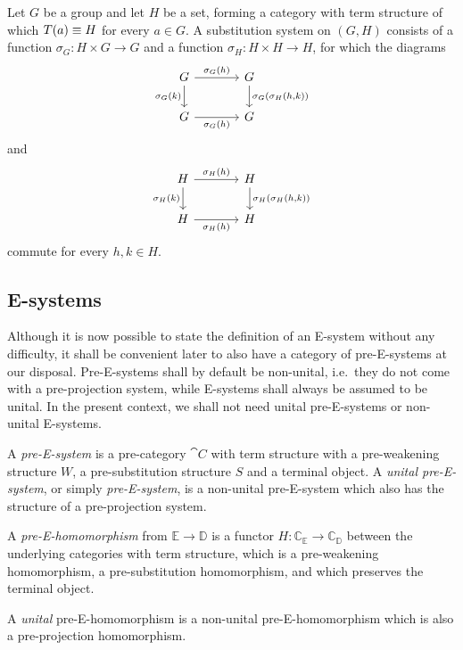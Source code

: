 \begin{eg}
Let $G$ be a group and let $H$ be a set, forming a category with term 
structure of which $T(a)\equiv H$ for every $a\in G$. A substitution
system on $(G,H)$ consists of a function $\sigma_G : H\times G\to G$ and
a function $\sigma_H:H\times H\to H$, for which the diagrams
\begin{equation*}
\begin{tikzcd}[column sep=large]
G \arrow[r,"\sigma_G(h)"]
  \arrow[d,swap,"\sigma_G(k)"]
  &
G \arrow[d,"{\sigma_G(\sigma_H(h,k))}"]
  \\
G \arrow[r,swap,"\sigma_G(h)"] 
& G
\end{tikzcd}
\end{equation*}
and
\begin{equation*}
\begin{tikzcd}[column sep=large]
H \arrow[r,"\sigma_H(h)"]
  \arrow[d,swap,"\sigma_H(k)"]
  &
H \arrow[d,"{\sigma_H(\sigma_H(h,k))}"]
  \\
H \arrow[r,swap,"\sigma_H(h)"]
  &
H
\end{tikzcd}
\end{equation*}
commute for every $h,k\in H$. 
\end{eg}

\subsection{E-systems}

Although it is now possible to state the definition of an E-system without
any difficulty, it shall be convenient later to also have a category of
pre-E-systems at our disposal. Pre-E-systems shall by default be non-unital,
i.e.~they do not come with a pre-projection system, while E-systems shall
always be assumed to be unital. In the present context, we shall not need
unital pre-E-systems or non-unital E-systems.

\begin{defn}
A \emph{pre-E-system} is a pre-category $\cat{C}$ with term structure
with a pre-weakening structure $W$, a pre-substitution structure $S$ and a terminal
object. A \emph{unital pre-E-system}, or simply \emph{pre-E-system}, is a non-unital pre-E-system
which also has the structure of a pre-projection system. 
\end{defn}

\begin{defn}
A \emph{pre-E-homomorphism} from $\mathbb{E}\to\mathbb{D}$ is a functor
$H:\mathbb{C}_\mathbb{E}\to\mathbb{C}_\mathbb{D}$ between the underlying categories
with term structure, which is a pre-weakening homomorphism, a pre-substitution
homomorphism, and which preserves the terminal object. 

A \emph{unital} pre-E-homomorphism is a non-unital pre-E-homomorphism which is 
also a pre-projection homomorphism. 
\end{defn}

